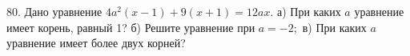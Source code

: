 80. Дано уравнение $4a^2(x-1)+9(x+1)=12ax.$ а) При каких $a$ уравнение имеет корень, равный 1? б) Решите уравнение при $a=-2;$ в) При каких $a$ уравнение имеет более двух корней?\\
